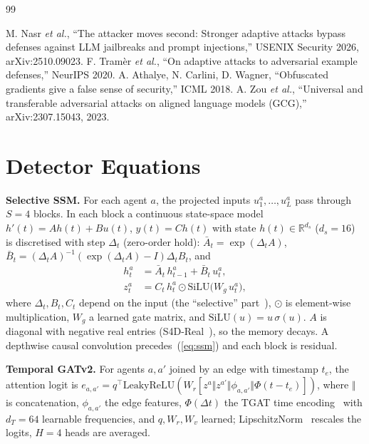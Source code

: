 \documentclass[conference,compsoc]{IEEEtran}
\newcommand{\R}{\mathbb{R}}
\begin{document}
\begin{thebibliography}{99}

 M. Nasr \textit{et al.}, ``The attacker moves second: Stronger adaptive attacks bypass defenses against LLM jailbreaks and prompt injections,'' USENIX Security 2026, arXiv:2510.09023.
 F. Tram{\`e}r \textit{et al.}, ``On adaptive attacks to adversarial example defenses,'' NeurIPS 2020.
 A. Athalye, N. Carlini, D. Wagner, ``Obfuscated gradients give a false sense of security,'' ICML 2018.
 A. Zou \textit{et al.}, ``Universal and transferable adversarial attacks on aligned language models (GCG),'' arXiv:2307.15043, 2023.

\end{thebibliography}

\appendices

\section{Detector Equations}
\label{app:detector}
\textbf{Selective SSM.} For each agent $a$, the projected inputs $u^{a}_{1},\dots,u^{a}_{L}$ pass through $S=4$ blocks. In each block a continuous state-space model $h'(t)=Ah(t)+Bu(t)$, $y(t)=Ch(t)$ with state $h(t)\in\R^{d_{s}}$ ($d_{s}=16$) is discretised with step $\Delta_{t}$ (zero-order hold): $\bar A_{t}=\exp(\Delta_{t}A)$, $\bar B_{t}=(\Delta_{t}A)^{-1}(\exp(\Delta_{t}A)-I)\Delta_{t}B_{t}$, and
\begin{align}
h^{a}_{t} &= \bar A_{t}\,h^{a}_{t-1} + \bar B_{t}\,u^{a}_{t}, \label{eq:ssm}\\
z^{a}_{t} &= C_{t}\,h^{a}_{t} \odot \mathrm{SiLU}\bigl(W_{g}\,u^{a}_{t}\bigr), \label{eq:gate}
\end{align}
where $\Delta_{t},B_{t},C_{t}$ depend on the input (the ``selective'' part~\cite{Gu2023Mamba}), $\odot$ is element-wise multiplication, $W_{g}$ a learned gate matrix, and $\mathrm{SiLU}(u)=u\,\sigma(u)$. $A$ is diagonal with negative real entries (S4D-Real~\cite{Gu2022S4D}), so the memory decays. A depthwise causal convolution precedes~(\ref{eq:ssm}) and each block is residual.

\textbf{Temporal GATv2.} For agents $a,a'$ joined by an edge with timestamp $t_{e}$, the attention logit is $e_{a,a'}=q^{\top}\mathrm{LeakyReLU}(W_{r}[z^{a}\Vert z^{a'}\Vert\phi_{a,a'}\Vert\Phi(t-t_{e})])$, where $\Vert$ is concatenation, $\phi_{a,a'}$ the edge features, $\Phi(\Delta t)$ the TGAT time encoding~\cite{Xu2020TGAT} with $d_{T}=64$ learnable frequencies, and $q,W_{r},W_{v}$ learned; LipschitzNorm~\cite{Dasoulas2021LipNorm} rescales the logits, $H=4$ heads are averaged.
\end{document}

